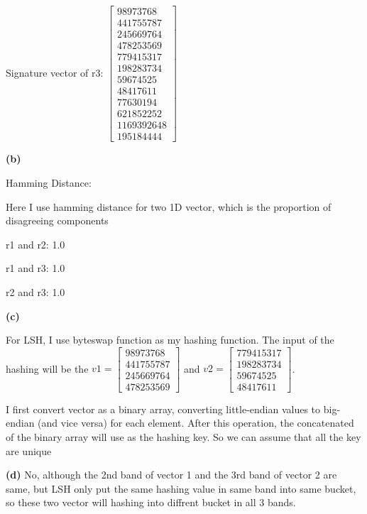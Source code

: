 \documentclass[11pt]{article}
\renewcommand\part[1]{\vspace{.10in}\textbf{(#1)}}
\begin{document}
Signature vector of r3:
$ \begin{bmatrix}
98973768\\  441755787 \\ 245669764  \\478253569 \\ 779415317\\  198283734\\
59674525 \\  48417611  \\ 77630194\\  621852252\\ 1169392648\\  195184444
\end{bmatrix} $


\part{b}

Hamming Distance:

Here I use hamming distance for two 1D vector, which is the proportion of disagreeing components

r1 and r2: 1.0


r1 and r3: 1.0


r2 and r3: 1.0

\part{c}

For LSH, I use byteswap function as my hashing function. The input of the hashing will be the  $ v1 = \begin{bmatrix}
98973768\\  441755787 \\ 245669764  \\478253569 
\end{bmatrix} $ and $ v2 = \begin{bmatrix}
 779415317\\  198283734\\
59674525 \\  48417611  
\end{bmatrix} $.

I first convert vector as a binary array, converting little-endian values to big-endian (and vice versa) for each element. After this operation, the concatenated of the binary array will use as the hashing key. So we can assume that all the key are unique

\part{d}
No, although the 2nd band of vector 1 and the 3rd band of vector 2 are same, but LSH only put the same hashing value in same band into same bucket, so these two vector will hashing into diffrent bucket in all 3 bands.
\end{document}
